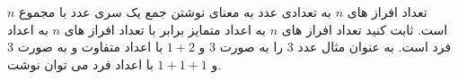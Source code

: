 \exercise
تعداد افراز های
$n$
به تعدادی عدد به معنای نوشتن جمع یک سری عدد با مجموع
$n$
است. ثابت کنید تعداد افراز های
$n$
به اعداد متمایز برابر با تعداد افراز های
$n$
به اعداد فرد است. به عنوان مثال عدد
$3$
را به صورت
$3$
و
$1 + 2$
با اعداد متفاوت و به صورت
$3$
و
$1 + 1 + 1$
با اعداد فرد می توان نوشت.